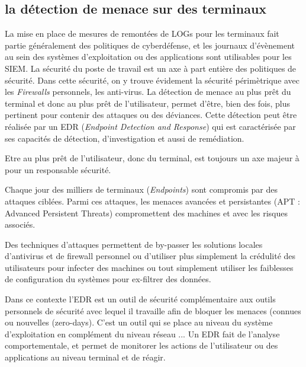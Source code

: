 

\subsection{la détection de menace sur des terminaux}

La mise en place de mesures de remontées de LOGs pour les terminaux fait partie généralement des politiques de cyberdéfense, et les journaux d'évènement au sein des systèmes d'exploitation ou des applications sont utilisables pour les SIEM.
La sécurité du poste de travail est un axe à part entière des politiques de sécurité. Dans cette sécurité, on y trouve évidement la sécurité périmètrique avec les \textit{Firewalls} personnels, les anti-virus. La détection de menace au plus prêt du terminal et donc au plus prêt de l'utilisateur, permet d'être, bien des fois, plus pertinent pour contenir des attaques ou des déviances. Cette détection peut être réalisée par un EDR (\textit{Endpoint Detection and Response}) qui est caractérisée par ses capacités de détection, d’investigation et aussi de remédiation.

Etre au plus prêt de l'utilisateur, donc du terminal, est toujours un axe majeur à pour un responsable sécurité.

Chaque jour des milliers de terminaux (\textit{Endpoints}) sont compromis par des attaques ciblées. Parmi ces attaques, les menaces avancées et persistantes (APT : Advanced Persistent Threats) compromettent des machines et avec les risques associés. 

Des techniques d'attaques permettent de by-passer les solutions locales d'antivirus et de firewall personnel ou d'utiliser plus simplement la crédulité des utilisateurs pour infecter des machines ou tout simplement utiliser les faiblesses de configuration du systèmes pour ex-filtrer des données.

Dans ce contexte l’EDR est un outil de sécurité complémentaire aux outils personnels de sécurité avec lequel il travaille afin de bloquer les menaces (connues ou nouvelles (zero-days). C’est un outil qui se place au niveau du système d'exploitation en complément du niveau réseau ...  Un EDR fait de l’analyse comportementale, et permet de monitorer les actions de l'utilisateur ou des applications au niveau  terminal et de réagir.

